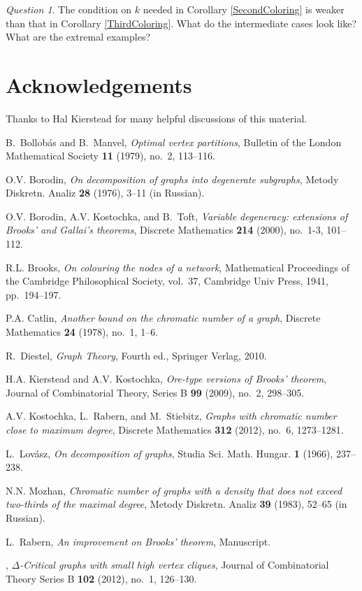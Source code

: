 \documentclass[12pt]{amsart}
\theoremstyle{plain}
\theoremstyle{definition}
\theoremstyle{remark}
\newtheorem*{question}{Question}
\begin{document}
\begin{question}
The condition on $k$ needed in Corollary \ref{SecondColoring} is weaker than that in Corollary \ref{ThirdColoring}.  What do the intermediate cases look like?  What are the extremal examples?
\end{question}

\section{Acknowledgements}
\noindent Thanks to Hal Kierstead for many helpful discussions of this material.

\begin{thebibliography}{99}

B.~Bollob{\'a}s and B.~Manvel, \emph{Optimal vertex partitions}, Bulletin of
  the London Mathematical Society \textbf{11} (1979), no.~2, 113--116.

O.V. Borodin, \emph{On decomposition of graphs into degenerate subgraphs},
  Metody Diskretn. Analiz \textbf{28} (1976), 3--11 (in Russian).

O.V. Borodin, A.V. Kostochka, and B.~Toft, \emph{{Variable degeneracy:
  extensions of Brooks' and Gallai's theorems}}, Discrete Mathematics
  \textbf{214} (2000), no.~1-3, 101--112.

R.L. Brooks, \emph{{On colouring the nodes of a network}}, Mathematical
  Proceedings of the Cambridge Philosophical Society, vol.~37, Cambridge Univ
  Press, 1941, pp.~194--197.

P.A. Catlin, \emph{{Another bound on the chromatic number of a graph}},
  Discrete Mathematics \textbf{24} (1978), no.~1, 1--6.

R.~Diestel, \emph{{Graph Theory}}, {Fourth} ed., Springer Verlag, 2010.

H.A. Kierstead and A.V. Kostochka, \emph{{Ore-type versions of Brooks'
  theorem}}, Journal of Combinatorial Theory, Series B \textbf{99} (2009),
  no.~2, 298--305.

A.V. Kostochka, L.~Rabern, and M.~Stiebitz, \emph{{Graphs with chromatic number
  close to maximum degree}}, Discrete Mathematics \textbf{312} (2012), no.~6,
  1273--1281.

L.~Lov\'{a}sz, \emph{On decomposition of graphs}, Studia Sci. Math. Hungar.
  \textbf{1} (1966), 237--238.

N.N. Mozhan, \emph{{Chromatic number of graphs with a density that does not
  exceed two-thirds of the maximal degree}}, Metody Diskretn. Analiz
  \textbf{39} (1983), 52--65 (in Russian).

L.~Rabern, \emph{{An improvement on Brooks' theorem}}, Manuscript.

\bysame, \emph{{$\Delta$-Critical graphs with small high vertex cliques}},
  Journal of Combinatorial Theory Series B \textbf{102} (2012), no.~1,
  126--130.

\end{thebibliography}
\end{document}
